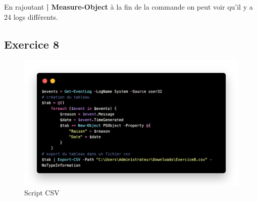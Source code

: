 \documentclass[12pt, a4paper]{article}
\begin{document}
En rajoutant \textbf{| Measure-Object} à la fin de la commande on peut voir qu'il y a 
24 logs différents.

\subsection{Exercice 8}
\begin{figure}[h]
    \centering
    \includegraphics[width=1\textwidth]{img/code3.png}
    \caption{Script CSV}
    \label{fig:script3}
\end{figure}
\end{document}
